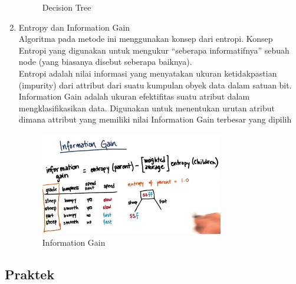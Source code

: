 \begin{enumerate}
\begin{figure}[H]
    \centering
    \caption{Decision Tree}
\end{figure}
\item Entropy dan Information Gain \\
Algoritma pada metode ini menggunakan konsep dari entropi. Konsep Entropi yang digunakan untuk mengukur “seberapa informatifnya” sebuah node (yang biasanya disebut seberapa baiknya).\\
Entropi adalah nilai informasi yang menyatakan ukuran ketidakpastian (impurity) dari attribut dari suatu kumpulan obyek data dalam satuan bit.\\
Information Gain adalah ukuran efektifitas suatu atribut dalam mengklasifikasikan data. Digunakan untuk menentukan urutan atribut dimana attribut yang memiliki nilai Information Gain terbesar yang dipilih

\begin{figure}[H]
    \includegraphics[width=8cm]{figures/1174086/2/en.jpg}
    \centering
    \caption{Information Gain}
\end{figure}




\end{enumerate}


\subsection{Praktek}

\hfill\\



